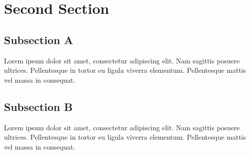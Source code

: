 \par\section{Second Section}
\par\subsection{Subsection A}
\par\noindent Lorem ipsum dolor sit amet, consectetur adipiscing elit. Nam sagittis posuere ultrices. Pellentesque in tortor eu ligula viverra elementum. Pellentesque mattis vel massa in consequat.
\par\subsection{Subsection B}\label{subsec:ch2.sec2.subsec2}
\par\noindent Lorem ipsum dolor sit amet, consectetur adipiscing elit. Nam sagittis posuere ultrices. Pellentesque in tortor eu ligula viverra elementum. Pellentesque mattis vel massa in consequat.